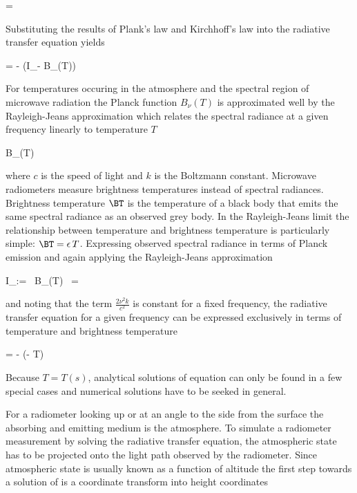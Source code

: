      \le \ABSCOEF = \epsilon {}
    \stopformula

    Substituting the results of Plank's law and Kirchhoff's law into the
    radiative transfer equation  yields

    \startformula
         = - \ABSCOEF(I_\nu - B_\nu(T)) \EQSTOP
    \stopformula

    For temperatures occuring in the atmosphere and the spectral region of
    microwave radiation the Planck function $B_\nu (T)$ is approximated
    well by the Rayleigh-Jeans approximation which relates the spectral
    radiance at a given frequency linearly to temperature $T$

    \startformula
        B_\nu(T) \approx {}
    \stopformula

    where $c$ is the speed of light and $k$ is the Boltzmann constant.
    Microwave radiometers measure brightness temperatures instead of spectral
    radiances. Brightness temperature $\BT$ is the temperature of a black body
    that emits the same spectral radiance as an observed grey body. In the
    Rayleigh-Jeans limit the relationship between temperature and brightness
    temperature is particularly simple: $\BT = \epsilon \, T$. Expressing
    observed spectral radiance in terms of Planck emission and again
    applying the Rayleigh-Jeans approximation

    \startformula
        I_\nu := \epsilon \, B_\nu(T)
            \approx \epsilon \, 
            =  \, \BT \EQCOMMA
    \stopformula

    and noting that the term $\frac{2 \nu^2 k}{c^2}$ is constant for a
    fixed frequency, the radiative transfer equation  for
    a given frequency can be expressed exclusively in terms of temperature and
    brightness temperature

    \startformula
         = - \ABSCOEF (\BT - T) \EQSTOP
    \stopformula

    Because $T = T(s)$, analytical solutions of equation 
    can only be found in a few special cases and numerical solutions have to
    be seeked in general.

\stopsection


\startsection[title={A Solution for Ground-based Radiometer Applications}]

    For a radiometer looking up or at an angle to the side from the surface the
    absorbing and emitting medium is the atmosphere. To simulate a radiometer
    measurement by solving the radiative transfer equation, the atmospheric
    state has to be projected onto the light path observed by the radiometer.
    Since atmospheric state is usually known as a function of altitude the
    first step towards a solution of  is a coordinate
    transform into height coordinates

